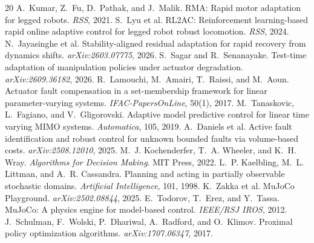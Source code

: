 \documentclass[10pt,twocolumn]{article}
\begin{document}

\begin{thebibliography}{20}\footnotesize
{} A.~Kumar, Z.~Fu, D.~Pathak, and J.~Malik. RMA: Rapid motor adaptation for legged robots. \emph{RSS}, 2021.
 S.~Lyu et al. RL2AC: Reinforcement learning-based rapid online adaptive control for legged robot robust locomotion. \emph{RSS}, 2024.
 N.~Jayasinghe et al. Stability-aligned residual adaptation for rapid recovery from dynamics shifts. \emph{arXiv:2603.07775}, 2026.
 S.~Sagar and R.~Senanayake. Test-time adaptation of manipulation policies under actuator degradation. \emph{arXiv:2609.36182}, 2026.
 R.~Lamouchi, M.~Amairi, T.~Raissi, and M.~Aoun. Actuator fault compensation in a set-membership framework for linear parameter-varying systems. \emph{IFAC-PapersOnLine}, 50(1), 2017.
 M.~Tanaskovic, L.~Fagiano, and V.~Gligorovski. Adaptive model predictive control for linear time varying MIMO systems. \emph{Automatica}, 105, 2019.
 A.~Daniels et al. Active fault identification and robust control for unknown bounded faults via volume-based costs. \emph{arXiv:2508.12010}, 2025.
 M.~J. Kochenderfer, T.~A. Wheeler, and K.~H. Wray. \emph{Algorithms for Decision Making}. MIT Press, 2022.
 L.~P. Kaelbling, M.~L. Littman, and A.~R. Cassandra. Planning and acting in partially observable stochastic domains. \emph{Artificial Intelligence}, 101, 1998.
 K.~Zakka et al. MuJoCo Playground. \emph{arXiv:2502.08844}, 2025.
 E.~Todorov, T.~Erez, and Y.~Tassa. MuJoCo: A physics engine for model-based control. \emph{IEEE/RSJ IROS}, 2012.
 J.~Schulman, F.~Wolski, P.~Dhariwal, A.~Radford, and O.~Klimov. Proximal policy optimization algorithms. \emph{arXiv:1707.06347}, 2017.
\end{thebibliography}
\end{document}
